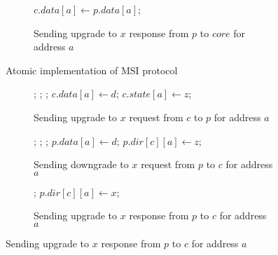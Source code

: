 \begin{figure}
\begin{subfigure}{\linewidth}
\begin{boxedminipage}{\linewidth}
\begin{algorithmic}
  \State $c.data[a] \gets p.data[a]$;
\EndProc
\end{algorithmic}
\end{boxedminipage}
\caption{Sending upgrade to $x$ response from $p$ to $core$ for address $a$}
\label{uResp}
\end{subfigure}

\caption{Atomic implementation of MSI protocol}
\label{atomic}
\end{figure}


\begin{figure}

\begin{subfigure}{\linewidth}
\begin{boxedminipage}{\linewidth}
\begin{algorithmic}
  \State \send{} ;
  \State \receive{} ;
    \State \receive{} ;
    \State $c.data[a] \gets d$;
  \EndIf
  \State $c.state[a] \gets z$;
\EndProc
\end{algorithmic}
\end{boxedminipage}
\caption{Sending upgrade to $x$ request from $c$ to $p$ for address $a$}
\label{uReqLocal}
\end{subfigure}

\begin{subfigure}{\linewidth}
\begin{boxedminipage}{\linewidth}
\begin{algorithmic}
  \State \send{} ;
  \State \receive{} ;
    \State \receive{} ;
    \State $p.data[a] \gets d$;
  \EndIf
  \State $p.dir[c][a] \gets z$;
\EndProc
\end{algorithmic}
\end{boxedminipage}
\caption{Sending downgrade to $x$ request from $p$ to $c$ for address $a$}
\label{dResp}
\end{subfigure}

\begin{subfigure}{\linewidth}
\begin{boxedminipage}{\linewidth}
\begin{algorithmic}
      \State \send{} ;
    \EndIf
    \State $p.dir[c][a] \gets x$;
  \EndIf
\EndProc
\end{algorithmic}
\end{boxedminipage}
\caption{Sending upgrade to $x$ response from $p$ to $c$ for address $a$}
\label{uResp}
\end{subfigure}


\end{figure}
